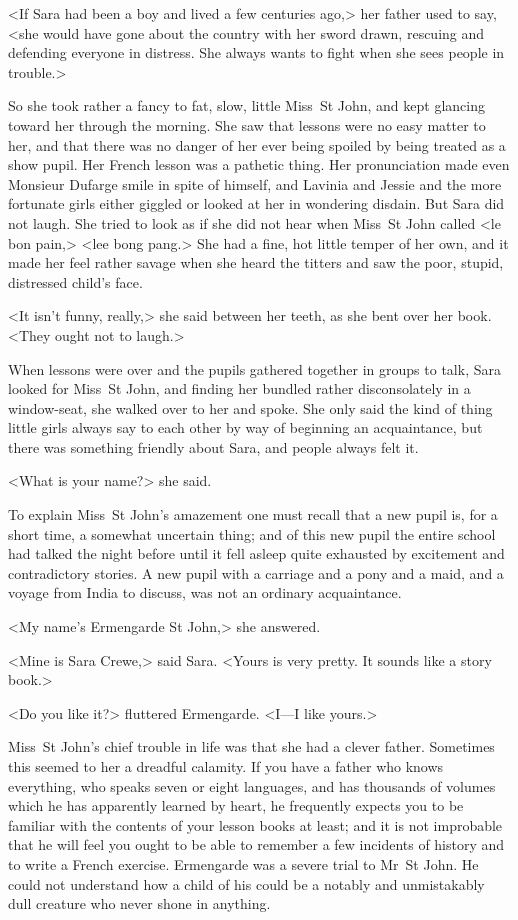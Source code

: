 <If Sara had been a boy and lived a few centuries ago,> her father used to say, <she would have gone about the country with her sword drawn, rescuing and defending everyone in distress. She always wants to fight when she sees people in trouble.>

So she took rather a fancy to fat, slow, little Miss~St John, and kept glancing toward her through the morning. She saw that lessons were no easy matter to her, and that there was no danger of her ever being spoiled by being treated as a show pupil. Her French lesson was a pathetic thing. Her pronunciation made even Monsieur Dufarge smile in spite of himself, and Lavinia and Jessie and the more fortunate girls either giggled or looked at her in wondering disdain. But Sara did not laugh. She tried to look as if she did not hear when Miss~St John called <le bon pain,> <lee bong pang.> She had a fine, hot little temper of her own, and it made her feel rather savage when she heard the titters and saw the poor, stupid, distressed child's face.

<It isn't funny, really,> she said between her teeth, as she bent over her book. <They ought not to laugh.>

When lessons were over and the pupils gathered together in groups to talk, Sara looked for Miss~St John, and finding her bundled rather disconsolately in a window-seat, she walked over to her and spoke. She only said the kind of thing little girls always say to each other by way of beginning an acquaintance, but there was something friendly about Sara, and people always felt it.

<What is your name?> she said.

To explain Miss~St John's amazement one must recall that a new pupil is, for a short time, a somewhat uncertain thing; and of this new pupil the entire school had talked the night before until it fell asleep quite exhausted by excitement and contradictory stories. A new pupil with a carriage and a pony and a maid, and a voyage from India to discuss, was not an ordinary acquaintance.

<My name's Ermengarde St John,> she answered.

<Mine is Sara Crewe,> said Sara. <Yours is very pretty. It sounds like a story book.>

<Do you like it?> fluttered Ermengarde. <I—I like yours.>

Miss~St John's chief trouble in life was that she had a clever father. Sometimes this seemed to her a dreadful calamity. If you have a father who knows everything, who speaks seven or eight languages, and has thousands of volumes which he has apparently learned by heart, he frequently expects you to be familiar with the contents of your lesson books at least; and it is not improbable that he will feel you ought to be able to remember a few incidents of history and to write a French exercise. Ermengarde was a severe trial to Mr~St John. He could not understand how a child of his could be a notably and unmistakably dull creature who never shone in anything.

